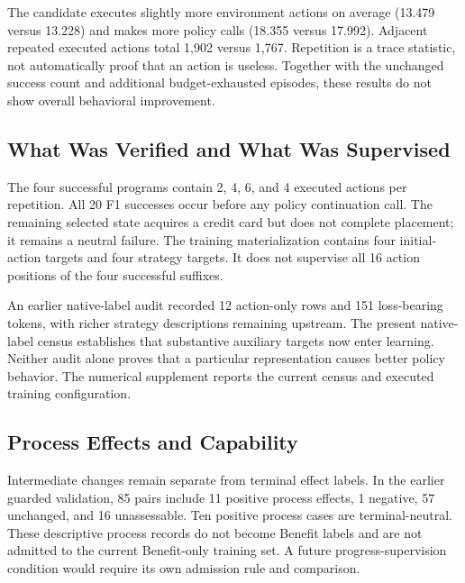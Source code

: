 The candidate executes slightly more environment actions on average
(13.479 versus 13.228) and makes more policy calls (18.355 versus 17.992).
Adjacent repeated executed actions total 1,902 versus 1,767. Repetition
is a trace statistic, not automatically proof that an action is useless.
Together with the unchanged success count and additional budget-exhausted
episodes, these results do not show overall behavioral improvement.

\subsection{What Was Verified and What Was Supervised}
\label{app:historical}
The four successful programs contain 2, 4, 6, and 4 executed actions per
repetition. All 20 F1 successes occur before any policy continuation call.
The remaining selected state acquires a credit card but does not complete
placement; it remains a neutral failure. The training materialization
contains four initial-action targets and four strategy targets. It does
not supervise all 16 action positions of the four successful suffixes.

An earlier native-label audit recorded 12 action-only rows and 151
loss-bearing tokens, with richer strategy descriptions remaining upstream.
The present native-label census establishes that substantive auxiliary
targets now enter learning. Neither audit alone proves that a particular
representation causes better policy behavior. The numerical supplement
reports the current census and executed training configuration.

\subsection{Process Effects and Capability}
Intermediate changes remain separate from terminal effect labels.
In the earlier guarded validation, 85 pairs include 11 positive process
effects, 1 negative, 57 unchanged, and 16 unassessable. Ten positive
process cases are terminal-neutral. These descriptive process records do
not become Benefit labels and are not admitted to the current
Benefit-only training set. A future progress-supervision condition would
require its own admission rule and comparison.


